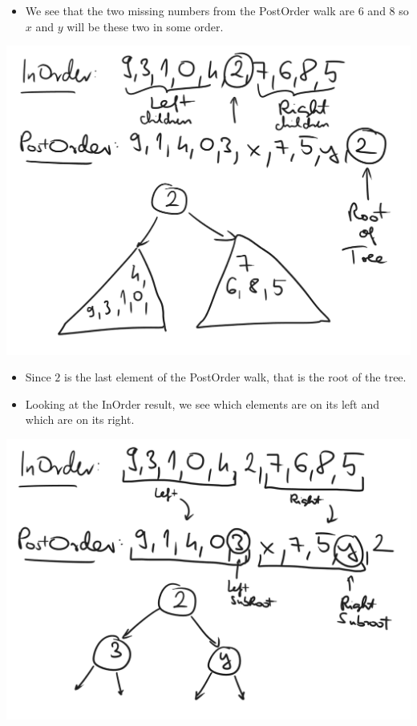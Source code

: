 \begin{itemize}
    \item We see that the two missing numbers from the PostOrder walk are $6$ and $8$ so $x$ and $y$ will be these two in some order.
\end{itemize}


\begin{center}
    \includegraphics[width=\linewidth]{11/11/reconstruct_02.png}
\end{center}

\begin{itemize}
    \item Since $2$ is the last element of the PostOrder walk, that is the root of the tree.
    \item Looking at the InOrder result, we see which elements are on its left and which are on its right.
\end{itemize}


\begin{center}
    \includegraphics[width=\linewidth]{11/11/reconstruct_03.png}
\end{center}

